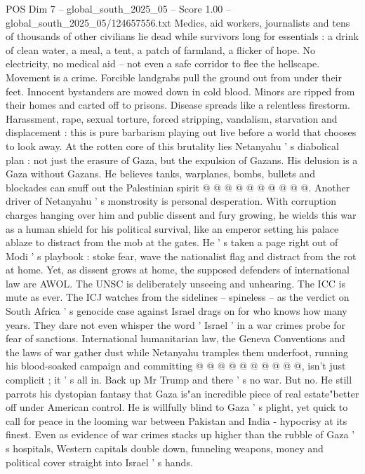 \begin{textsample}{POS Dim 7 – global\_south\_2025\_05 – Score 1.00 – global\_south\_2025\_05/124657556.txt}  \label{ex:f7_pos_239}
Medics, aid workers, journalists and tens of thousands of other civilians lie dead while survivors long for essentials : a drink of clean water, a meal, a tent, a patch of farmland, a flicker of hope.
No electricity, no medical aid -- not even a safe corridor to flee the hellscape.
Movement is a crime.
Forcible landgrabs pull the ground out from under their feet.
Innocent bystanders are mowed down in cold blood.
Minors are ripped from their homes and carted off to prisons.
Disease spreads like a relentless firestorm.
Harassment, rape, sexual torture, forced stripping, vandalism, starvation and displacement : this is pure barbarism playing out live before a world that chooses to look away.
At the rotten core of this brutality lies Netanyahu ' s diabolical plan : not just the erasure of Gaza, but the expulsion of Gazans.
His delusion is a Gaza without Gazans.
He believes tanks, warplanes, bombs, bullets and blockades can snuff out the Palestinian spirit @ @ @ @ @ @ @ @ @ @.
Another driver of Netanyahu ' s monstrosity is personal desperation.
With corruption charges hanging over him and public dissent and fury growing, he wields this war as a human shield for his political survival, like an emperor setting his palace ablaze to distract from the mob at the gates.
He ' s taken a page right out of Modi ' s playbook : stoke fear, wave the nationalist flag and distract from the rot at home.
Yet, as dissent grows at home, the supposed defenders of international law are AWOL.
The UNSC is deliberately unseeing and unhearing.
The ICC is mute as ever.
The ICJ watches from the sidelines -- spineless -- as the verdict on South Africa ' s genocide case against Israel drags on for who knows how many years.
They dare not even whisper the word ' Israel ' in a war crimes probe for fear of sanctions.
International humanitarian law, the Geneva Conventions and the laws of war gather dust while Netanyahu tramples them underfoot, running his blood-soaked campaign and committing @ @ @ @ @ @ @ @ @ @, isn't just complicit ; it ' s all in.
Back up Mr Trump and there ' s no war.
But no.
He still parrots his dystopian fantasy that Gaza is"an incredible piece of real estate"better off under American control.
He is willfully blind to Gaza ' s plight, yet quick to call for peace in the looming war between Pakistan and India - hypocrisy at its finest.
Even as evidence of war crimes stacks up higher than the rubble of Gaza ' s hospitals, Western capitals double down, funneling weapons, money and political cover straight into Israel ' s hands.

\end{textsample}
